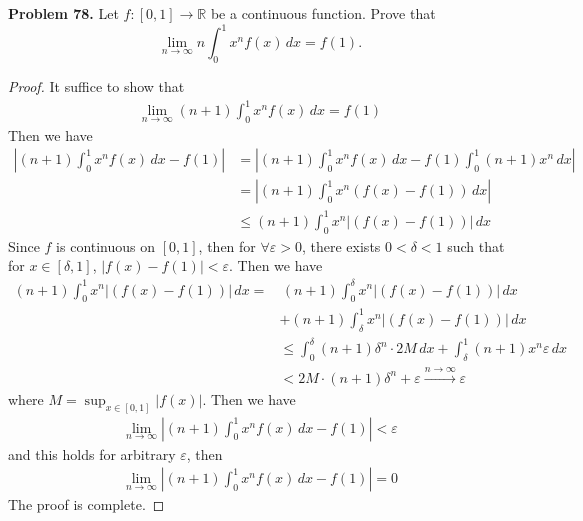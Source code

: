 \documentclass[12pt,leqno]{amsart}
\begin{document}
\noindent
{\bf Problem 78.}
Let $f:[0,1]\to\mathbb{R}$ be a continuous function. Prove that
$$
\lim_{n\to\infty} n\int_0^1 x^nf(x)\, dx=f(1).
$$
\begin{proof}
It suffice to show that 
\begin{align*}
    \lim_{n\to\infty} (n+1)\int_0^1 x^nf(x)\, dx=f(1)
\end{align*}
Then we have 
\begin{align*}
    \left|(n+1)\int_0^1 x^nf(x)\, dx - f(1)\right| & = \left|(n+1)\int_0^1 x^nf(x)\, dx - f(1)\int_0^1 (n+1)x^n\, dx\right| \\
    & = \left|(n+1)\int_0^1 x^n \left(f(x)-f(1)\right)\, dx\right| \\
    & \leq (n+1)\int_0^1 x^n \left| \left(f(x)-f(1)\right)\right|\, dx
\end{align*}
Since $f$ is continuous on $[0,1]$, then for $\forall \varepsilon > 0$, there exists $0 < \delta < 1$ such that for $x\in[\delta, 1]$, $\left|f(x) - f(1)\right| < \varepsilon$. Then we have 
\begin{align*}
    (n+1)\int_0^1 x^n \left| \left(f(x)-f(1)\right)\right|\, dx = &\,  (n+1)\int_0^\delta x^n \left| \left(f(x)-f(1)\right)\right|\, dx \\
    & + (n+1)\int_\delta^1 x^n \left| \left(f(x)-f(1)\right)\right|\, dx \\
    & \leq \int^\delta_0(n+1)\delta^n \cdot 2M\, dx + \int^1_\delta (n+1)x^n \varepsilon\, dx \\
    & < 2M\cdot (n+1)\delta^n + \varepsilon \xrightarrow{n\to\infty} \varepsilon
\end{align*}
where $M = \sup_{x\in[0,1]}|f(x)|$. Then we have 
\begin{align*}
    \lim_{n\to\infty}\left|(n+1)\int_0^1 x^nf(x)\, dx - f(1)\right| < \varepsilon
\end{align*}
and this holds for arbitrary $\varepsilon$, then 
\begin{align*}
    \lim_{n\to\infty}\left|(n+1)\int_0^1 x^nf(x)\, dx - f(1)\right| = 0
\end{align*}
The proof is complete.
\end{proof}

\medskip
\end{document}
